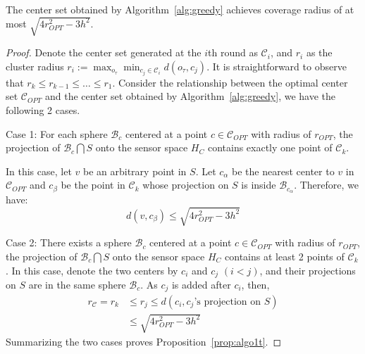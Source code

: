 \begin{proposition}
\label{prop:algo1t}
The center set obtained by Algorithm~\ref{alg:greedy} achieves coverage radius of at most
$\sqrt{4r_{OPT}^2 - 3h^2}$.
\vspace{-1mm}
\end{proposition}
\begin{proof}


Denote the center set generated at the 
$i$th round as $\mathcal{C}_{i}$, and $r_i$ as the cluster radius $r_i := \max_{o_\tau}\min_{c_j \in \mathcal{C}_i} d(o_\tau, c_j)$. It is straightforward to observe that $r_k\leq r_{k-1} \leq \dots \leq r_1$.
Consider the relationship between the optimal center set $\mathcal{C}_{OPT}$ and the center set obtained by Algorithm~\ref{alg:greedy}, we have the following 2 cases.

Case 1: For each sphere $\mathcal{B}_{c}$ centered at a point $c\in\mathcal{C}_{OPT}$ with radius of $r_{OPT}$, the projection of $\mathcal{B}_{c}\bigcap S$ onto the sensor space $H_C$
contains exactly one point of $\mathcal{C}_k$. 


In this case, let $v$ be an arbitrary point in $S$. 
Let $c_{\alpha}$ be the nearest center to $v$ in $\mathcal{C}_{OPT}$ 
and $c_{\beta}$ be the point in $\mathcal{C}_k$ whose projection on $S$ is inside $\mathcal{B}_{c_{\alpha}}$. 
Therefore, we have: 
\begin{equation}
    d(v, c_\beta) 
    \leq 
    \sqrt{4r_{OPT}^2 - 3h^2}
\end{equation}

Case 2: There exists a sphere $\mathcal{B}_{c}$ centered at a point $c\in\mathcal{C}_{OPT}$ with radius of $r_{OPT}$, the projection of $\mathcal{B}_{c}\bigcap S$ onto the sensor space $H_C$
contains at least 2 points of $\mathcal{C}_k$. 
In this case, denote the two centers by $c_i$ and $c_j$ $(i<j)$, and their projections on $S$ are in the same sphere $\mathcal{B}_c$. As $c_j$ is added after $c_i$, then,
\begin{equation}
    \begin{split}
    r_\mathcal{C} = r_k 
    &\leq r_{j}
    \leq d(c_i, c_j\text{'s projection on } S)\\
    &\leq \sqrt{4r_{OPT}^2 - 3h^2}
    \end{split}
\end{equation}
Summarizing the two cases proves Proposition~\ref{prop:algo1t}.
\vspace{-2mm}
\end{proof}

